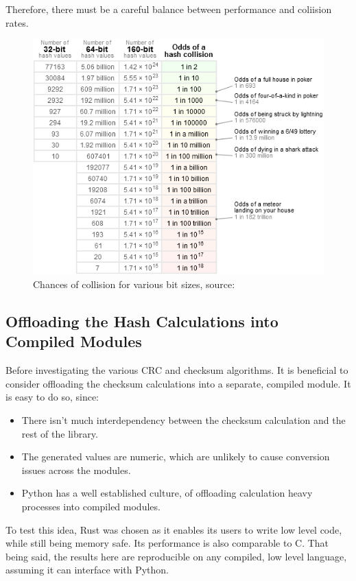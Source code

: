 Therefore, there must be a careful balance between performance and coliision rates.

\begin{figure}[H]
    \centering
    \includegraphics[width=12cm]{figures/checksum/collisions}
    \caption{Chances of collision for various bit sizes, source: ~\cite{PreshingCollisions}}
    \label{fig:checksum_fig_1}
\end{figure}



\subsection{Offloading the Hash Calculations into Compiled Modules}
Before investigating the various CRC and checksum algorithms.
It is beneficial to consider offloading the checksum calculations into a separate, compiled module.
It is easy to do so, since:

\begin{itemize}
    \item There isn't much interdependency between the checksum calculation and the rest of the library.
    \item The generated values are numeric, which are unlikely to cause conversion issues across the modules.
    \item Python has a well established culture, of offloading calculation heavy processes into compiled modules.
\end{itemize}

To test this idea, Rust was chosen as it enables its users to write low level code, while still being memory safe.
Its performance is also comparable to C. That being said, the results here are reproducible on any compiled, low level
language, assuming it can interface with Python.

